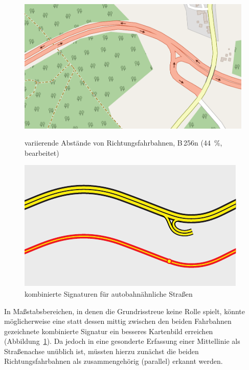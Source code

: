 \documentclass[../main/thesis.tex]{subfiles}
\begin{document}
\begin{figure}[ht]
  \begin{minipage}[t]{.5\linewidth}
    \centering
    \includegraphics[width=\ScaleIfNeeded]{../chapter2/b256@2-z16}
    \caption{variierende Abstände von Richtungsfahrbahnen, B\,256n (44~\%, bearbeitet)}\label{fig:b256}
  \end{minipage}%
  \begin{minipage}[t]{.5\linewidth}
    \centering
    \includegraphics[width=\ScaleIfNeeded]{../chapter2/combined-symbols}
    \caption{kombinierte Signaturen für autobahnähnliche Straßen}\label{fig:dual-carriageway}
  \end{minipage}
\end{figure}

In Maßstabsbereichen, in denen die Grundrisstreue keine Rolle spielt, könnte möglicherweise eine statt dessen mittig zwischen den beiden Fahrbahnen gezeichnete kombinierte Signatur ein besseres Kartenbild erreichen (Abbildung~\ref{fig:dual-carriageway}).
Da jedoch in \osm{} eine gesonderte Erfassung einer Mittellinie als Straßenachse unüblich ist, müssten hierzu zunächst die beiden Richtungsfahrbahnen als zusammengehörig (parallel) erkannt werden.
\end{document}

